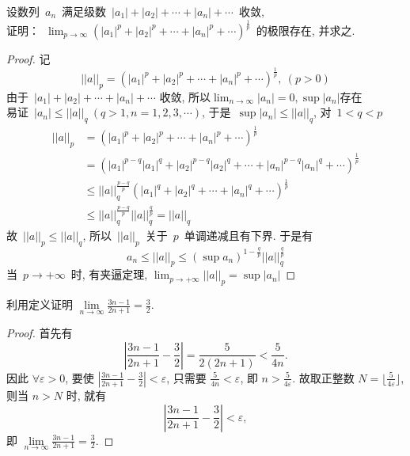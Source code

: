 \documentclass[color=green,titlestyle=hang]{elegantbook}%
\begin{document}
\begin{example}
设数列~$a_n$~满足级数~$|a_1|+|a_2|+\cdots+|a_n|+\cdots$~收敛,\\ 证明：~$\displaystyle\lim_{p\to\infty}(|a_1|^p+|a_2|^p+\cdots+|a_n|^p+\cdots)^{\frac{1}{p}}$~的极限存在, 并求之.
\end{example}\begin{proof}
记\[||a||_p=\left(|a_1|^p+|a_2|^p+\cdots+|a_n|^p+\cdots\right)^{\frac{1}{p}}, ~(p>0)\]
由于~$|a_1|+|a_2|+\cdots+|a_n|+\cdots$ 收敛, 所以$\displaystyle\lim_{n\to\infty}|a_n|=0, \sup|a_n|$存在\\
易证~$|a_n|\leq ||a||_q~(q>1, n=1,2,3,\cdots)$, 于是~$\sup |a_n|\leq ||a||_q$, 对~$1<q<p$
\begin{align*}
||a||_p&=(|a_1|^p+|a_2|^p+\cdots+|a_n|^p+\cdots)^{\frac{1}{p}}\\
&=  (|a_1|^{p-q}|a_1|^q+|a_2|^{p-q}|a_2|^q+\cdots+|a_n|^{p-q}|a_n|^q+\cdots)^{\frac{1}{p}}\\
&\leq ||a||_q^{\frac{p-q}{p}}(|a_1|^q+|a_2|^q+\cdots+|a_n|^q+\cdots)^{\frac{1}{p}}\\
&\leq ||a||_q^{\frac{p-q}{p}}||a||_q^{\frac{q}{p}}=||a||_q
\end{align*}
故~$||a||_p \leq ||a||_q$, 所以~$||a||_p$~关于~$p$~单调递减且有下界.
于是有
\[a_n\leq ||a||_p\leq (\sup a_n)^{1-\frac{q}{p}}||a||_q^{\frac{q}{p}}\]
当~$p\to+\infty$~时, 有夹逼定理, $\displaystyle\lim_{p\to+\infty}||a||_p=\sup |a_n|$	
\end{proof}


\begin{example}
利用定义证明 $\lim\limits_{n\to\infty}\frac{3n-1}{2n+1}=\frac{3}{2}$.
\end{example}\begin{proof}
首先有 \[\left|\frac{3n-1}{2n+1}-\frac{3}{2}\right|=\frac{5}{2(2n+1)}<\frac{5}{4n}.\]
因此 $\forall \varepsilon >0$,
要使 $\left|\frac{3n-1}{2n+1}-\frac{3}{2}\right|<\varepsilon$, 只需要 $\frac{5}{4n}<\varepsilon$, 即 $n>\frac{5}{4\varepsilon}$.
故取正整数 $N=\Big\lfloor\frac{5}{4\varepsilon}\Big\rfloor$, \\
则当 $n>N$ 时, 就有\[\left|\frac{3n-1}{2n+1}-\frac{3}{2}\right|<\varepsilon,\]
即 $\lim\limits_{n\to\infty}\frac{3n-1}{2n+1}=\frac{3}{2}$. 		
\end{proof}
\end{document}
